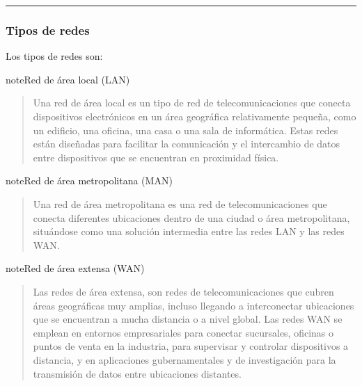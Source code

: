 \documentclass[letterpaper,10pt,spanish]{sphinxmanual}
\begin{document}
\bigskip\hrule\bigskip



\subsubsection{Tipos de redes}
\label{\detokenize{1_guias/10informatica/G1003:tipos-de-redes}}
\sphinxAtStartPar
Los tipos de redes son:

\begin{sphinxadmonition}{note}{Red de área local (LAN)}
\begin{quote}

\sphinxAtStartPar
Una red de área local es un tipo de red de telecomunicaciones que conecta dispositivos electrónicos en un área geográfica relativamente pequeña, como un edificio, una oficina, una casa o una sala de informática. Estas redes están diseñadas para facilitar la comunicación y el intercambio de datos entre dispositivos que se encuentran en proximidad física.
\end{quote}
\end{sphinxadmonition}

\begin{sphinxadmonition}{note}{Red de área metropolitana (MAN)}
\begin{quote}

\sphinxAtStartPar
Una red de área metropolitana es una red de telecomunicaciones que conecta diferentes ubicaciones dentro de una ciudad o área metropolitana, situándose como una solución intermedia entre las redes LAN y las redes WAN.
\end{quote}
\end{sphinxadmonition}

\begin{sphinxadmonition}{note}{Red de área extensa (WAN)}
\begin{quote}

\sphinxAtStartPar
Las redes de área extensa, son redes de telecomunicaciones que cubren áreas geográficas muy amplias, incluso llegando a interconectar ubicaciones que se encuentran a mucha distancia o a nivel global. Las redes WAN se emplean en entornos empresariales para conectar sucursales, oficinas o puntos de venta en la industria, para supervisar y controlar dispositivos a distancia, y en aplicaciones gubernamentales y de investigación para la transmisión de datos entre ubicaciones distantes.
\end{quote}
\end{sphinxadmonition}
\end{document}
